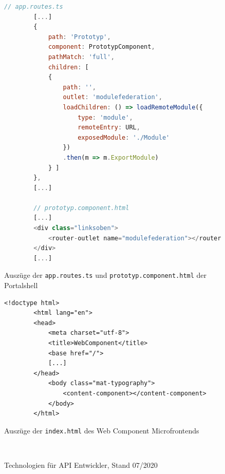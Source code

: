 \newpage
\begin{figure}[bht]
	\begin{lstlisting}[caption=Einbindung des Module Federation Microfrontends, label=list:EinbindungModuleFederation, language=Javascript]
		// app.routes.ts
		[...]
		{
			path: 'Prototyp',
			component: PrototypComponent,
			pathMatch: 'full',
			children: [
			{
				path: '', 
				outlet: 'modulefederation',
				loadChildren: () => loadRemoteModule({
					type: 'module',
					remoteEntry: URL,
					exposedModule: './Module'
				})
				.then(m => m.ExportModule)
			} ]
		},
		[...]
	
		// prototyp.component.html		
		[...]
		<div class="linksoben">
			<router-outlet name="modulefederation"></router-outlet>
		</div>		
		[...]
	\end{lstlisting}
	\footnoterule{}
	\footnotesize{Auszüge der \texttt{app.routes.ts} und \texttt{prototyp.component.html} der Portalshell}
\end{figure}

\newpage
\begin{figure}[bht]
	\begin{lstlisting}[caption=Einbindung einer Content-Component als Web Component, label=list:SelbstEinbindenWC]
		<!doctype html>
		<html lang="en">
		<head>
			<meta charset="utf-8">
			<title>WebComponent</title>
			<base href="/">
			[...]
		</head>
			<body class="mat-typography">
				<content-component></content-component>
			</body>
		</html>
	\end{lstlisting}
	\footnoterule{}
	\footnotesize{Auszüge der \texttt{index.html} des Web Component Microfrontends}
\end{figure}

\newpage
{}\label{app:Bilder}

\begin{figure}[hbt!]
	\centering
	\begin{minipage}[t]{0.9\textwidth}	
		\caption{Technologien für API Entwickler, Stand 07/2020}
		\\ %
		\label{fig:StatistikMicroServices}
	\end{minipage}
\end{figure}

